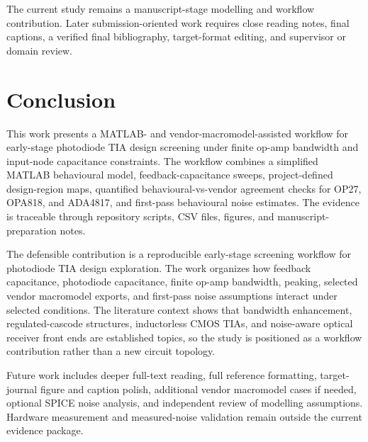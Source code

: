 The current study remains a manuscript-stage modelling and workflow contribution. Later submission-oriented work requires close reading notes, final captions, a verified final bibliography, target-format editing, and supervisor or domain review.

\section{Conclusion}

This work presents a MATLAB- and vendor-macromodel-assisted workflow for early-stage photodiode TIA design screening under finite op-amp bandwidth and input-node capacitance constraints. The workflow combines a simplified MATLAB behavioural model, feedback-capacitance sweeps, project-defined design-region maps, quantified behavioural-vs-vendor agreement checks for OP27, OPA818, and ADA4817, and first-pass behavioural noise estimates. The evidence is traceable through repository scripts, CSV files, figures, and manuscript-preparation notes.

The defensible contribution is a reproducible early-stage screening workflow for photodiode TIA design exploration. The work organizes how feedback capacitance, photodiode capacitance, finite op-amp bandwidth, peaking, selected vendor macromodel exports, and first-pass noise assumptions interact under selected conditions. The literature context shows that bandwidth enhancement, regulated-cascode structures, inductorless CMOS TIAs, and noise-aware optical receiver front ends are established topics, so the study is positioned as a workflow contribution rather than a new circuit topology.

Future work includes deeper full-text reading, full reference formatting, target-journal figure and caption polish, additional vendor macromodel cases if needed, optional SPICE noise analysis, and independent review of modelling assumptions. Hardware measurement and measured-noise validation remain outside the current evidence package.
